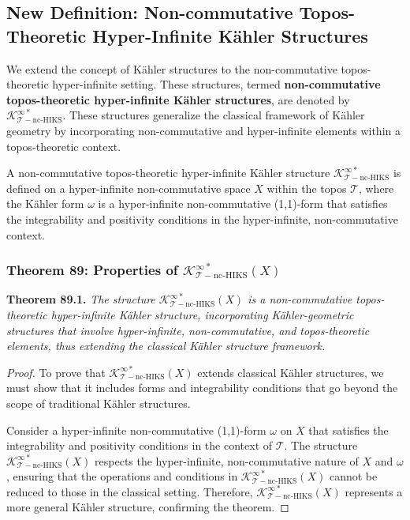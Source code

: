 \documentclass{article}
\begin{document}
\subsection{New Definition: Non-commutative Topos-Theoretic Hyper-Infinite Kähler Structures}
We extend the concept of Kähler structures to the non-commutative topos-theoretic hyper-infinite setting. These structures, termed \textbf{non-commutative topos-theoretic hyper-infinite Kähler structures}, are denoted by \(\mathcal{K}_{\mathcal{T}-\text{nc-HIKS}}^{\infty *}\). These structures generalize the classical framework of Kähler geometry by incorporating non-commutative and hyper-infinite elements within a topos-theoretic context.

A non-commutative topos-theoretic hyper-infinite Kähler structure \(\mathcal{K}_{\mathcal{T}-\text{nc-HIKS}}^{\infty *}\) is defined on a hyper-infinite non-commutative space \(X\) within the topos \(\mathcal{T}\), where the Kähler form \(\omega\) is a hyper-infinite non-commutative (1,1)-form that satisfies the integrability and positivity conditions in the hyper-infinite, non-commutative context.

\subsubsection{Theorem 89: Properties of \(\mathcal{K}_{\mathcal{T}-\text{nc-HIKS}}^{\infty *}(X)\)}
\textbf{Theorem 89.1.} \textit{The structure \(\mathcal{K}_{\mathcal{T}-\text{nc-HIKS}}^{\infty *}(X)\) is a non-commutative topos-theoretic hyper-infinite Kähler structure, incorporating Kähler-geometric structures that involve hyper-infinite, non-commutative, and topos-theoretic elements, thus extending the classical Kähler structure framework.}

\begin{proof}
To prove that \(\mathcal{K}_{\mathcal{T}-\text{nc-HIKS}}^{\infty *}(X)\) extends classical Kähler structures, we must show that it includes forms and integrability conditions that go beyond the scope of traditional Kähler structures.

Consider a hyper-infinite non-commutative (1,1)-form \(\omega\) on \(X\) that satisfies the integrability and positivity conditions in the context of \(\mathcal{T}\). The structure \(\mathcal{K}_{\mathcal{T}-\text{nc-HIKS}}^{\infty *}(X)\) respects the hyper-infinite, non-commutative nature of \(X\) and \(\omega\), ensuring that the operations and conditions in \(\mathcal{K}_{\mathcal{T}-\text{nc-HIKS}}^{\infty *}(X)\) cannot be reduced to those in the classical setting. Therefore, \(\mathcal{K}_{\mathcal{T}-\text{nc-HIKS}}^{\infty *}(X)\) represents a more general Kähler structure, confirming the theorem.
\end{proof}
\end{document}
